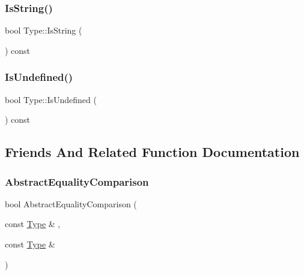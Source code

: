 \mbox{\label{class_type_a0deae255e3c14229999eba05ad9f8e64}} 
\subsubsection{\texorpdfstring{Is\+String()}{IsString()}}
{\footnotesize\ttfamily bool Type\+::\+Is\+String (\begin{DoxyParamCaption}{ }\end{DoxyParamCaption}) const}

\mbox{\label{class_type_aaa2f4f96dd01eb3fd832f9a5e1d57615}} 
\subsubsection{\texorpdfstring{Is\+Undefined()}{IsUndefined()}}
{\footnotesize\ttfamily bool Type\+::\+Is\+Undefined (\begin{DoxyParamCaption}{ }\end{DoxyParamCaption}) const}



\subsection{Friends And Related Function Documentation}
\mbox{\label{class_type_afd48ec25622d42183a8c9daaf4f470df}} 
\subsubsection{\texorpdfstring{Abstract\+Equality\+Comparison}{AbstractEqualityComparison}}
{\footnotesize\ttfamily bool Abstract\+Equality\+Comparison (\begin{DoxyParamCaption}\item[{const \hyperlink{class_type}{Type} \&}]{,  }\item[{const \hyperlink{class_type}{Type} \&}]{ }\end{DoxyParamCaption})\hspace{0.3cm}{\ttfamily [friend]}}

